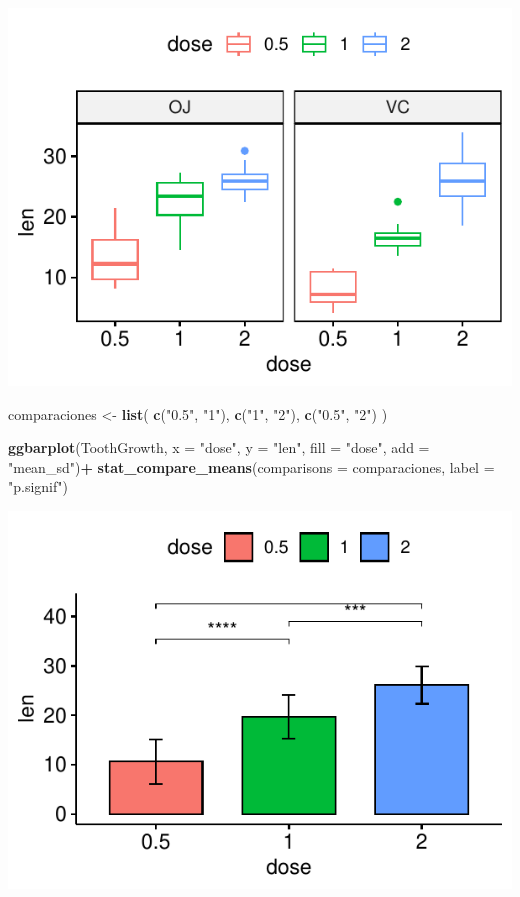 \documentclass[
]{book}
\newenvironment{Shaded}{\begin{snugshade}}{\end{snugshade}}
\newcommand{\AttributeTok}[1]{\textcolor[rgb]{0.13,0.29,0.53}{#1}}
\newcommand{\FunctionTok}[1]{\textcolor[rgb]{0.13,0.29,0.53}{\textbf{#1}}}
\newcommand{\NormalTok}[1]{#1}
\newcommand{\OtherTok}[1]{\textcolor[rgb]{0.56,0.35,0.01}{#1}}
\newcommand{\SpecialCharTok}[1]{\textcolor[rgb]{0.81,0.36,0.00}{\textbf{#1}}}
\newcommand{\StringTok}[1]{\textcolor[rgb]{0.31,0.60,0.02}{#1}}
\begin{document}
\begin{center}\includegraphics{R_Manual_files/figure-latex/unnamed-chunk-228-1} \end{center}

\begin{Shaded}
\begin{Highlighting}[]
\NormalTok{comparaciones }\OtherTok{\textless{}{-}} \FunctionTok{list}\NormalTok{( }\FunctionTok{c}\NormalTok{(}\StringTok{"0.5"}\NormalTok{, }\StringTok{"1"}\NormalTok{), }\FunctionTok{c}\NormalTok{(}\StringTok{"1"}\NormalTok{, }\StringTok{"2"}\NormalTok{), }\FunctionTok{c}\NormalTok{(}\StringTok{"0.5"}\NormalTok{, }\StringTok{"2"}\NormalTok{) )}

\FunctionTok{ggbarplot}\NormalTok{(ToothGrowth, }\AttributeTok{x =} \StringTok{"dose"}\NormalTok{, }\AttributeTok{y =} \StringTok{"len"}\NormalTok{, }\AttributeTok{fill =} \StringTok{"dose"}\NormalTok{, }\AttributeTok{add =} \StringTok{"mean\_sd"}\NormalTok{)}\SpecialCharTok{+}
  \FunctionTok{stat\_compare\_means}\NormalTok{(}\AttributeTok{comparisons =}\NormalTok{ comparaciones, }\AttributeTok{label =} \StringTok{"p.signif"}\NormalTok{)}
\end{Highlighting}
\end{Shaded}

\begin{center}\includegraphics{R_Manual_files/figure-latex/unnamed-chunk-228-2} \end{center}
\end{document}

